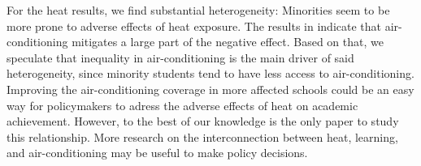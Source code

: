 For the heat results, we find substantial heterogeneity: Minorities seem to be more prone to adverse effects of heat exposure. The results in \cite{Goodman_2020} indicate that air-conditioning mitigates a large part of the negative effect. Based on that, we speculate that inequality in air-conditioning is the main driver of said heterogeneity, since minority students tend to have less access to air-conditioning. Improving the air-conditioning coverage in more affected schools could be an easy way for policymakers to adress the adverse effects of heat on academic achievement. However, to the best of our knowledge \cite{Goodman_2020} is the only paper to study this relationship. More research on the interconnection between heat, learning, and air-conditioning may be useful to make policy decisions.




